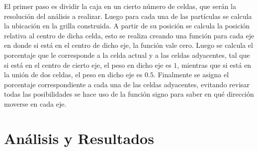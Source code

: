 El primer paso es dividir la caja en un cierto número de celdas, que serán la resolución del análisis a realizar. Luego para cada una de las partículas se calcula la ubicación en la grilla construida. A partir de su posición se calcula la posición relativa al centro de dicha celda, esto se realiza creando una función para cada eje en donde si está en el centro de dicho eje, la función vale cero. Luego se calcula el porcentaje que le corresponde a la celda actual y a las celdas adyacentes, tal que si está en el centro de cierto eje, el peso en dicho eje es $1$, mientras que si está en la unión de dos celdas, el peso en dicho eje es $0.5$. Finalmente se asigna el porcentaje correspondiente a cada una de las celdas adyacentes, evitando revisar todas las posibilidades se hace uso de la función signo para saber en qué dirección moverse en cada eje. 


\section{Análisis y Resultados}
